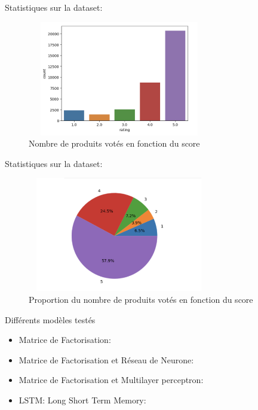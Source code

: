 \documentclass[xelatex,12pt]{beamer}
\begin{document}
\begin{frame}{Statistiques sur la dataset:}
\begin{figure}[h]
\begin{center}
\includegraphics[width=8cm,height=5cm]{images/user_proportion.png}
\caption[Nombre de produits votés en fonction du score]{Nombre de produits votés en fonction du score}
\label{monlabel}
\end{center}
\end{figure}
\end{frame}

\begin{frame}{Statistiques sur la dataset:}
\begin{figure}[h]
\begin{center}
\includegraphics[width=8cm,height=5cm]{images/pie_user_vote.png}
\caption[Proportion du nombre de produits votés en fonction du score]{Proportion du nombre de produits votés en fonction du score}
\label{monlabel}
\end{center}
\end{figure}
\end{frame}

\begin{frame}{Différents modèles testés}
	\begin{itemize}
  		\item Matrice de Factorisation:
		\item Matrice de Factorisation et Réseau de Neurone:
		\item Matrice de Factorisation et Multilayer perceptron:
		\item LSTM: Long Short Term Memory:
	\end{itemize}
\end{frame}
\end{document}
